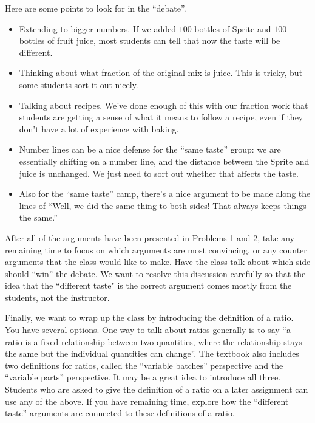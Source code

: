 \documentclass[nooutcomes,noauthor,handout]{ximera}
\begin{document}
\begin{instructorNotes}
Here are some points to look for in the ``debate''.
\begin{itemize}
    \item Extending to bigger numbers.  If we added $100$ bottles of Sprite and $100$ bottles of fruit juice, most students can tell that now the taste will be different.
    \item Thinking about what fraction of the original mix is juice.  This is tricky, but some students sort it out nicely.
    \item Talking about recipes.  We've done enough of this with our fraction work that students are getting a sense of what it means to follow a recipe, even if they don't have a lot of experience with baking.
    \item Number lines can be a nice defense for the ``same taste'' group: we are essentially shifting on a number line, and the distance between the Sprite and juice is unchanged.  We just need to sort out whether that affects the taste.
    \item Also for the ``same taste'' camp, there's a nice argument to be made along the lines of ``Well, we did the same thing to both sides!  That always keeps things the same.''  
\end{itemize}


After all of the arguments have been presented in Problems 1 and 2, take any remaining time to focus on which arguments are most convincing, or any counter arguments that the class would like to make. Have the class talk about which side should ``win'' the debate. We want to resolve this discussion carefully so that the idea that the ``different taste" is the correct argument comes mostly from the students, not the instructor.

Finally, we want to wrap up the class by introducing the definition of a ratio. You have several options. One way to talk about ratios generally is to say ``a ratio is a fixed relationship between two quantities, where the relationship stays the same but the individual quantities can change''. The textbook also includes two definitions for ratios, called the ``variable batches'' perspective and the ``variable parts'' perspective. It may be a great idea to introduce all three. Students who are asked to give the definition of a ratio on a later assignment can use any of the above. If you have remaining time, explore how the ``different taste'' arguments are connected to these definitions of a ratio.


\end{instructorNotes}
\end{document}
